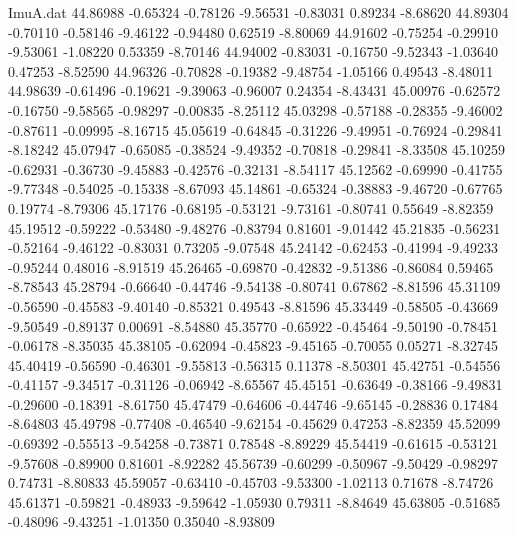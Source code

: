 \begin{filecontents}{ImuA.dat}
  44.86988   -0.65324   -0.78126   -9.56531   -0.83031    0.89234   -8.68620
  44.89304   -0.70110   -0.58146   -9.46122   -0.94480    0.62519   -8.80069
  44.91602   -0.75254   -0.29910   -9.53061   -1.08220    0.53359   -8.70146
  44.94002   -0.83031   -0.16750   -9.52343   -1.03640    0.47253   -8.52590
  44.96326   -0.70828   -0.19382   -9.48754   -1.05166    0.49543   -8.48011
  44.98639   -0.61496   -0.19621   -9.39063   -0.96007    0.24354   -8.43431
  45.00976   -0.62572   -0.16750   -9.58565   -0.98297   -0.00835   -8.25112
  45.03298   -0.57188   -0.28355   -9.46002   -0.87611   -0.09995   -8.16715
  45.05619   -0.64845   -0.31226   -9.49951   -0.76924   -0.29841   -8.18242
  45.07947   -0.65085   -0.38524   -9.49352   -0.70818   -0.29841   -8.33508
  45.10259   -0.62931   -0.36730   -9.45883   -0.42576   -0.32131   -8.54117
  45.12562   -0.69990   -0.41755   -9.77348   -0.54025   -0.15338   -8.67093
  45.14861   -0.65324   -0.38883   -9.46720   -0.67765    0.19774   -8.79306
  45.17176   -0.68195   -0.53121   -9.73161   -0.80741    0.55649   -8.82359
  45.19512   -0.59222   -0.53480   -9.48276   -0.83794    0.81601   -9.01442
  45.21835   -0.56231   -0.52164   -9.46122   -0.83031    0.73205   -9.07548
  45.24142   -0.62453   -0.41994   -9.49233   -0.95244    0.48016   -8.91519
  45.26465   -0.69870   -0.42832   -9.51386   -0.86084    0.59465   -8.78543
  45.28794   -0.66640   -0.44746   -9.54138   -0.80741    0.67862   -8.81596
  45.31109   -0.56590   -0.45583   -9.40140   -0.85321    0.49543   -8.81596
  45.33449   -0.58505   -0.43669   -9.50549   -0.89137    0.00691   -8.54880
  45.35770   -0.65922   -0.45464   -9.50190   -0.78451   -0.06178   -8.35035
  45.38105   -0.62094   -0.45823   -9.45165   -0.70055    0.05271   -8.32745
  45.40419   -0.56590   -0.46301   -9.55813   -0.56315    0.11378   -8.50301
  45.42751   -0.54556   -0.41157   -9.34517   -0.31126   -0.06942   -8.65567
  45.45151   -0.63649   -0.38166   -9.49831   -0.29600   -0.18391   -8.61750
  45.47479   -0.64606   -0.44746   -9.65145   -0.28836    0.17484   -8.64803
  45.49798   -0.77408   -0.46540   -9.62154   -0.45629    0.47253   -8.82359
  45.52099   -0.69392   -0.55513   -9.54258   -0.73871    0.78548   -8.89229
  45.54419   -0.61615   -0.53121   -9.57608   -0.89900    0.81601   -8.92282
  45.56739   -0.60299   -0.50967   -9.50429   -0.98297    0.74731   -8.80833
  45.59057   -0.63410   -0.45703   -9.53300   -1.02113    0.71678   -8.74726
  45.61371   -0.59821   -0.48933   -9.59642   -1.05930    0.79311   -8.84649
  45.63805   -0.51685   -0.48096   -9.43251   -1.01350    0.35040   -8.93809

\end{filecontents}
